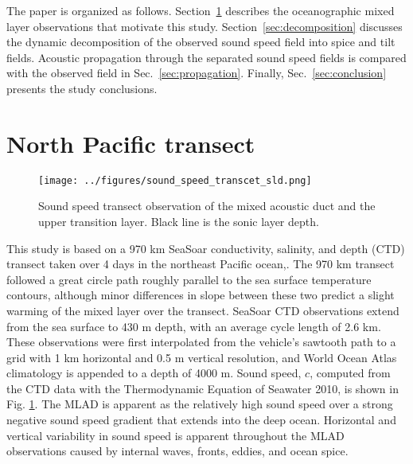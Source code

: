 \documentclass[preprint,NumberedRefs]{JASA}
\begin{document}
The paper is organized as follows. Section~\ref{sec:transcet} describes the oceanographic mixed layer observations that motivate this study. Section~\ref{sec:decomposition} discusses the dynamic decomposition of the observed sound speed field into spice and tilt fields. Acoustic propagation through the separated sound speed fields is compared with the observed field in Sec.~\ref{sec:propagation}. Finally, Sec.~\ref{sec:conclusion} presents the study conclusions.

\section{North Pacific transect}\label{sec:transcet}
\begin{figure}
\texttt{[image: ../figures/sound\_speed\_transcet\_sld.png]}
\caption{\label{fig:c_grid}{Sound speed transect observation of the mixed acoustic duct and the upper transition layer. Black line is the sonic layer depth.}}
\end{figure}

This study is based on a 970 km SeaSoar conductivity, salinity, and depth (CTD) transect taken over 4 days in the northeast Pacific ocean,\citep{cole2010seasonal}. The 970 km transect followed a great circle path roughly parallel to the sea surface temperature contours, although minor differences in slope between these two predict a slight warming of the mixed layer over the transect. SeaSoar CTD observations extend from the sea surface to 430 m depth, with an average cycle length of 2.6 km. These observations were first interpolated from the vehicle's sawtooth path to a grid with 1 km horizontal and 0.5 m vertical resolution\citep{colosi2020observations}, and World Ocean Atlas climatology is appended to a depth of 4000 m\citep{WOA}. Sound speed, $c$, computed from the CTD data with the Thermodynamic Equation of Seawater 2010,\cite{TEOS10} is shown in Fig. \ref{fig:c_grid}. The MLAD is apparent as the relatively high sound speed over a strong negative sound speed gradient that extends into the deep ocean. Horizontal and vertical variability in sound speed is apparent throughout the MLAD observations caused by internal waves, fronts, eddies, and ocean spice\citep{colosi2020observations}.
\end{document}
